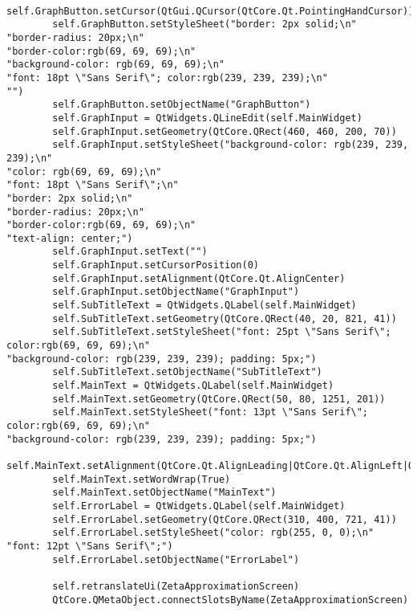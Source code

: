 \documentclass{article}
\begin{document}
\begin{lstlisting}
        self.GraphButton.setCursor(QtGui.QCursor(QtCore.Qt.PointingHandCursor))
        self.GraphButton.setStyleSheet("border: 2px solid;\n"
"border-radius: 20px;\n"
"border-color:rgb(69, 69, 69);\n"
"background-color: rgb(69, 69, 69);\n"
"font: 18pt \"Sans Serif\"; color:rgb(239, 239, 239);\n"
"")
        self.GraphButton.setObjectName("GraphButton")
        self.GraphInput = QtWidgets.QLineEdit(self.MainWidget)
        self.GraphInput.setGeometry(QtCore.QRect(460, 460, 200, 70))
        self.GraphInput.setStyleSheet("background-color: rgb(239, 239, 239);\n"
"color: rgb(69, 69, 69);\n"
"font: 18pt \"Sans Serif\";\n"
"border: 2px solid;\n"
"border-radius: 20px;\n"
"border-color:rgb(69, 69, 69);\n"
"text-align: center;")
        self.GraphInput.setText("")
        self.GraphInput.setCursorPosition(0)
        self.GraphInput.setAlignment(QtCore.Qt.AlignCenter)
        self.GraphInput.setObjectName("GraphInput")
        self.SubTitleText = QtWidgets.QLabel(self.MainWidget)
        self.SubTitleText.setGeometry(QtCore.QRect(40, 20, 821, 41))
        self.SubTitleText.setStyleSheet("font: 25pt \"Sans Serif\"; color:rgb(69, 69, 69);\n"
"background-color: rgb(239, 239, 239); padding: 5px;")
        self.SubTitleText.setObjectName("SubTitleText")
        self.MainText = QtWidgets.QLabel(self.MainWidget)
        self.MainText.setGeometry(QtCore.QRect(50, 80, 1251, 201))
        self.MainText.setStyleSheet("font: 13pt \"Sans Serif\"; color:rgb(69, 69, 69);\n"
"background-color: rgb(239, 239, 239); padding: 5px;")
        self.MainText.setAlignment(QtCore.Qt.AlignLeading|QtCore.Qt.AlignLeft|QtCore.Qt.AlignTop)
        self.MainText.setWordWrap(True)
        self.MainText.setObjectName("MainText")
        self.ErrorLabel = QtWidgets.QLabel(self.MainWidget)
        self.ErrorLabel.setGeometry(QtCore.QRect(310, 400, 721, 41))
        self.ErrorLabel.setStyleSheet("color: rgb(255, 0, 0);\n"
"font: 12pt \"Sans Serif\";")
        self.ErrorLabel.setObjectName("ErrorLabel")

        self.retranslateUi(ZetaApproximationScreen)
        QtCore.QMetaObject.connectSlotsByName(ZetaApproximationScreen)


\end{lstlisting}
\end{document}
